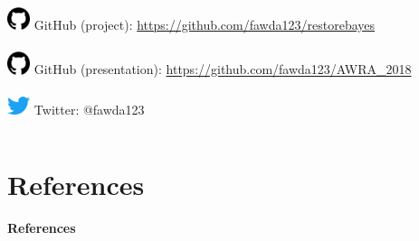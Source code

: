 \documentclass[serif]{beamer}\usepackage[]{graphicx}\usepackage[]{color}
\begin{document}
\begin{frame}
\begin{columns}
\begin{column}{0.5\textwidth}
\includegraphics[width = 0.05\textwidth]{fig/git.png} GitHub (project): \href{https://github.com/fawda123/restorebayes}{https://github.com/fawda123/restorebayes}\\~\\
\includegraphics[width = 0.05\textwidth]{fig/git.png} GitHub (presentation): \href{https://github.com/fawda123/AWRA_2018}{https://github.com/fawda123/AWRA\_2018}\\~\\
\includegraphics[width = 0.05\textwidth]{fig/twitter.png} Twitter: @fawda123
\end{column}
\end{columns}
\vspace{0.2in}
\end{frame}


\section{References}
\begin{frame}[t,shrink]{\textbf{References}}
\tiny
{}


\end{frame}
\end{document}
